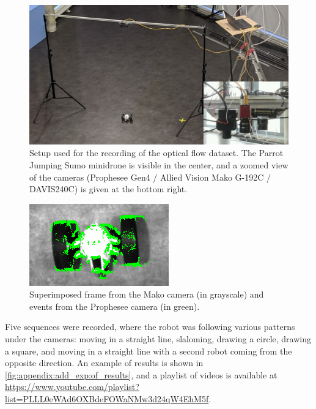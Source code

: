 \begin{figure}
  \centering
  \includegraphics[width=0.85\linewidth]{mainmatter/figures/a_additional_exp/of_dataset/setup.jpg}
  \caption{Setup used for the recording of the optical flow dataset. The Parrot Jumping Sumo minidrone is visible in the center, and a zoomed view of the cameras (Prophesee Gen4 / Allied Vision Mako G-192C / DAVIS240C) is given at the bottom right.}\label{fig:appendix:add_exp:of_dataset_setup}
\end{figure}

\begin{figure}
  \centering
  \includegraphics[width=0.3\linewidth]{mainmatter/figures/a_additional_exp/of_dataset/superimposed.png}
  \caption{Superimposed frame from the Mako camera (in grayscale) and events from the Prophesee camera (in green).}\label{fig:appendix:add_exp:of_superimposition}
\end{figure}

Five sequences were recorded, where the robot was following various patterns under the cameras: moving in a straight line, slaloming, drawing a circle, drawing a square, and moving in a straight line with a second robot coming from the opposite direction. An example of results is shown in \cref{fig:appendix:add_exp:of_results}, and a playlist of videos is available at {\small\url{https://www.youtube.com/playlist?list=PLLL0eWAd6OXBdeFOWaNMw3d24qW4EhM5f}.}

